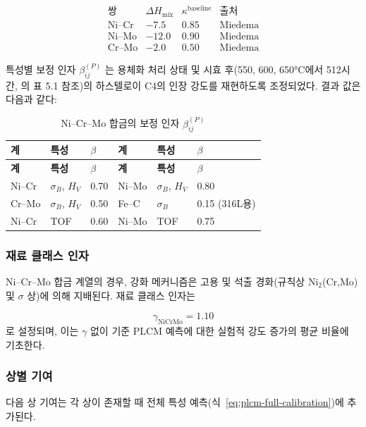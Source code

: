 \documentclass[12pt,a4paper]{article}
\begin{document}
	\[
	\begin{array}{lccc}
		\text{쌍} & \Delta H_{\text{mix}} & \kappa^{\text{baseline}} & \text{출처} \\
		\hline
		\text{Ni–Cr} & -7.5 & 0.85 & \text{Miedema} \\
		\text{Ni–Mo} & -12.0 & 0.90 & \text{Miedema} \\
		\text{Cr–Mo} & -2.0 & 0.50 & \text{Miedema}
	\end{array}
	\]
	
	특성별 보정 인자 $\beta_{ij}^{(P)}$ 는 용체화 처리 상태 및 시효 후(550, 600, 650°C에서 512시간, \cite{dis2025}의 표 5.1 참조)의 하스텔로이 C4의 인장 강도를 재현하도록 조정되었다. 결과 값은 다음과 같다:
	
	\begin{longtable}{p{1.5cm} p{1.5cm} p{1.5cm} p{1.5cm} p{1.5cm} p{1.5cm}}
		\caption{Ni–Cr–Mo 합금의 보정 인자 $\beta_{ij}^{(P)}$}\label{tab:nicrmo_beta}\\
		\toprule
		\textbf{계} & \textbf{특성} & $\beta$ & \textbf{계} & \textbf{특성} & $\beta$ \\
		\midrule
		\endfirsthead
		\toprule
		\textbf{계} & \textbf{특성} & $\beta$ & \textbf{계} & \textbf{특성} & $\beta$ \\
		\midrule
		\endhead
		Ni–Cr   & $\sigma_B$, $H_V$ & 0.70 & Ni–Mo   & $\sigma_B$, $H_V$ & 0.80 \\
		Cr–Mo   & $\sigma_B$, $H_V$ & 0.50 & Fe–C    & $\sigma_B$        & 0.15 (316L용) \\
		Ni–Cr   & TOF              & 0.60 & Ni–Mo   & TOF              & 0.75 \\
		\bottomrule
	\end{longtable}
	
	\subsubsection{재료 클래스 인자}
	Ni–Cr–Mo 합금 계열의 경우, 강화 메커니즘은 고용 및 석출 경화(규칙상 Ni$_2$(Cr,Mo) 및 $\sigma$ 상)에 의해 지배된다. 재료 클래스 인자는
	
	\[
	\gamma_{\text{NiCrMo}} = 1.10
	\]
	로 설정되며, 이는 $\gamma$ 없이 기준 PLCM 예측에 대한 실험적 강도 증가의 평균 비율에 기초한다.
	
	\subsubsection{상별 기여}
	다음 상 기여는 각 상이 존재할 때 전체 특성 예측(식~\ref{eq:plcm-full-calibration})에 추가된다.
	
\end{document}
